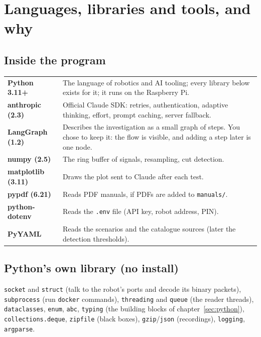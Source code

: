 \documentclass[10pt]{article}
\newcommand{\brkus}{\textunderscore\allowbreak}
\newcommand{\f}[1]{\texttt{\let\_\brkus #1}}
\begin{document}
\section{Languages, libraries and tools, and why}

\subsection{Inside the program}
\begin{center}\small
\begin{tabularx}{\linewidth}{@{}>{\bfseries}l X@{}}
\toprule
Python 3.11+ & The language of robotics and AI tooling; every library below exists for it; it runs on the Raspberry Pi. \\
anthropic (2.3) & Official Claude SDK: retries, authentication, adaptive thinking, effort, prompt caching, server fallback. \\
LangGraph (1.2) & Describes the investigation as a small graph of steps. You chose to keep it: the flow is visible, and adding a step later is one node. \\
numpy (2.5) & The ring buffer of signals, resampling, cut detection. \\
matplotlib (3.11) & Draws the plot sent to Claude after each test. \\
pypdf (6.21) & Reads PDF manuals, if PDFs are added to \f{manuals/}. \\
python-dotenv & Reads the \f{.env} file (API key, robot address, PIN). \\
PyYAML & Reads the scenarios and the catalogue sources (later the detection thresholds). \\
\bottomrule
\end{tabularx}
\end{center}

\subsection{Python's own library (no install)}
\f{socket} and \f{struct} (talk to the robot's ports and decode its binary packets),
\f{subprocess} (run \f{docker} commands), \f{threading} and \f{queue} (the reader threads),
\f{dataclasses}, \f{enum}, \f{abc}, \f{typing} (the building blocks of chapter~\ref{sec:python}),
\f{collections.deque}, \f{zipfile} (black boxes), \f{gzip}/\f{json} (recordings),
\f{logging}, \f{argparse}.
\end{document}
